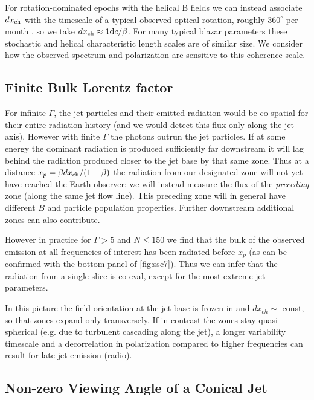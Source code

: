 For rotation-dominated epochs with the helical B fields we can instead associate $dx_{\rm ch}$ with the timescale of a typical observed optical rotation, roughly $360^{\circ}$ per month \citep{blinov_robopol_2018}, so we take $dx_{\rm ch} \approx 1{\rm d} c/\beta$. For many typical blazar parameters these stochastic and helical characteristic length scales are of similar size. We consider how the observed spectrum and polarization are sensitive to this coherence scale.

\subsection{Finite Bulk Lorentz factor}

For infinite $\Gamma$, the jet particles and their emitted radiation would be co-spatial for their entire radiation history (and we would detect this flux only along the jet axis). However with finite $\Gamma$ the photons outrun the jet particles. If at some energy the dominant radiation is produced sufficiently far downstream it will lag behind the radiation produced closer to the jet base by that same zone. Thus at a distance $x_p = \beta dx_{\rm ch} / (1 - \beta)$ the radiation from our designated zone will not yet have reached the Earth observer; we will instead measure the flux of the {\it preceding} zone (along the same jet flow line). This preceding zone will in general have different $B$ and particle population properties. Further downstream additional zones can also contribute.

However in practice for $\Gamma > 5$ and $N \leq 150$ we find that the bulk of the observed emission at all frequencies of interest has been radiated before $x_p$ (as can be confirmed with the bottom panel of \cref{fig:ssc7}). Thus we can infer that the radiation from a single slice is co-eval, except for the most extreme jet parameters. 

In this picture the field orientation at the jet base is frozen in and $dx_{ch}\sim$ const, so that zones expand only transversely. If in contrast the zones stay quasi-spherical (e.g. due to turbulent cascading along the jet), a longer variability timescale and a decorrelation in polarization compared to higher frequencies can result for late jet emission (radio). 

\subsection{Non-zero Viewing Angle of a Conical Jet}

